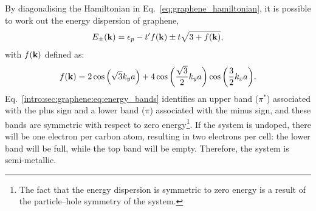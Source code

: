 By diagonalising the Hamiltonian in Eq.~\ref{eq:graphene_hamiltonian}, it is possible to work out the energy dispersion of graphene,
%
\begin{equation}\label{intro:sec:graphene:eq:energy_bands}
    E_{\pm}(\boldsymbol{\mathbf{k}}) = \epsilon_p - t'f(\boldsymbol{\mathbf{k}}) \pm t\sqrt{3 + f(\boldsymbol{\mathbf{k}})},
\end{equation}
%
with $f(\boldsymbol{\mathbf{k}})$ defined as:
%
\begin{equation}\label{intro:sec:graphene:eq:energy_bands_fk}
    f(\boldsymbol{\mathbf{k}})=2\cos{\left(\sqrt{3}k_ya\right)} + 4\cos{\qty(\frac{\sqrt{3}}{2}k_ya)}\cos{\qty(\frac{3}{2}k_xa)}.
\end{equation}
%
Eq.~\ref{intro:sec:graphene:eq:energy_bands} identifies an upper band ($\pi^*$) associated with the plus sign and a lower band ($\pi$) associated with the minus sign, and these bands are symmetric with respect to zero energy\footnote[3]{The fact that the energy dispersion is symmetric to zero energy is a result of the particle--hole symmetry of the system.}. If the system is undoped, there will be one electron per carbon atom, resulting in two electrons per cell: the lower band will be full, while the top band will be empty. Therefore, the system is semi-metallic.

